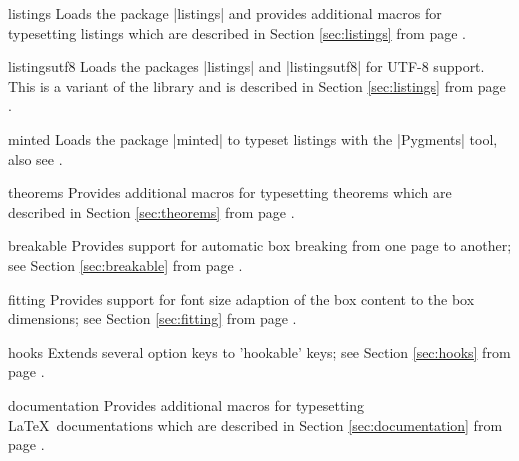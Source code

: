 {\begin{docTcbKey}[library]{listings}{}{}
  Loads the package |listings| \cite{heinz:2007a} and provides additional
  macros for typesetting listings which are described in Section \ref{sec:listings}
  from page \pageref{sec:listings}.
\end{docTcbKey}

\begin{docTcbKey}[library]{listingsutf8}{}{}
  Loads the packages |listings| \cite{heinz:2007a} and
  |listingsutf8| \cite{oberdiek:2011a} for UTF-8 support.
  This is a variant of the library 
  and is described in Section \ref{sec:listings}
  from page \pageref{sec:listings}.
\end{docTcbKey}

\begin{docTcbKey}[library]{minted}{}{}
  Loads the package |minted| \cite{rudolph:2011a} to
  typeset listings with the |Pygments| \cite{pygments:2013} tool,
  also see .
\end{docTcbKey}

\begin{docTcbKey}[library]{theorems}{}{}
  Provides additional
  macros for typesetting theorems which are described in Section \ref{sec:theorems}
  from page \pageref{sec:theorems}.
\end{docTcbKey}


\begin{docTcbKey}[library]{breakable}{}{}
  Provides support for automatic box breaking from one page to another;
  see Section \ref{sec:breakable} from page \pageref{sec:breakable}.
\end{docTcbKey}

\begin{docTcbKey}[library]{fitting}{}{}
  Provides support for font size adaption of the box content to
  the box dimensions;
  see Section \ref{sec:fitting} from page \pageref{sec:fitting}.
\end{docTcbKey}

\begin{docTcbKey}[library]{hooks}{}{}
  Extends several option keys to 'hookable' keys;
  see Section \ref{sec:hooks} from page \pageref{sec:hooks}.
\end{docTcbKey}

\begin{docTcbKey}[library]{documentation}{}{}
  Provides additional
  macros for typesetting \LaTeX\ documentations
  which are described in Section \ref{sec:documentation}
  from page \pageref{sec:documentation}.
\end{docTcbKey}

}
